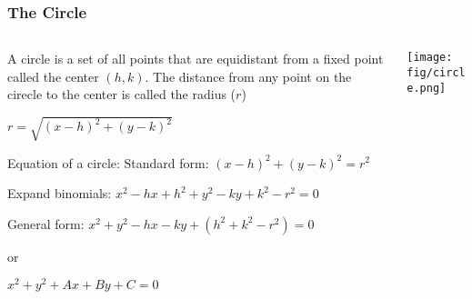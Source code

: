 \documentclass{beamer}
\begin{document}
\begin{frame}\frametitle{The Circle}
\begin{columns}
\begin{column}{7.5cm}

A circle is a set of all points that are equidistant from a fixed point called the center $(h,k)$. The distance from any point on the cirecle to the center is called the radius ($r$)

$r = \sqrt{(x-h)^2 + (y-k)^2}$ \newline

Equation of a circle: \newline
Standard form: $(x-h)^2 + (y-k)^2 = r^2$ \newline

Expand binomials: $x^2-hx+h^2+y^2-ky+k^2 - r^2 = 0$ \newline

General form: $x^2+y^2-hx-ky+(h^2+k^2-r^2)=0$

\hspace*{10mm} or

$x^2 + y^2 + Ax + By + C = 0$

\end{column}
\begin{column}{3.5cm}
\begin{center}
\texttt{[image: fig/circle.png]}
\end{center}
\end{column}
\end{columns}
\end{frame}
\end{document}
